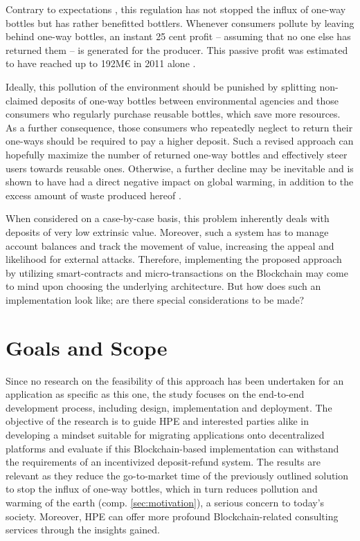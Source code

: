 Contrary to expectations  \cite[p.~10]{Hartlep2011Recycling}, this regulation has not stopped the influx of one-way bottles but has rather benefitted bottlers. Whenever consumers pollute by leaving behind one-way bottles, an instant 25 cent profit -- assuming that no one else has returned them -- is generated for the producer. This passive profit was estimated to have reached up to 192M\euro{} in 2011 alone \cite[p.~245]{PWC2011Mehrweg}. 


Ideally, this pollution of the environment should be punished by splitting non-claimed deposits of one-way bottles between environmental agencies and those consumers who regularly purchase reusable bottles, which save more resources. As a further consequence, those consumers who repeatedly neglect to return their one-ways should be required to pay a higher deposit. Such a revised approach can hopefully maximize the number of returned one-way bottles and effectively steer users towards reusable ones. Otherwise, a further decline may be inevitable and is shown to have had a direct negative impact on global warming, in addition to the excess amount of waste produced hereof \cite{DUHEinweg}.

When considered on a case-by-case basis, this problem inherently deals with deposits of very low extrinsic value. Moreover, such a system has to manage account balances and track the movement of value, increasing the appeal and likelihood for external attacks. Therefore, implementing the proposed approach by utilizing smart-contracts and micro-transactions on the Blockchain may come to mind upon choosing the underlying architecture. But how does such an implementation look like; are there special considerations to be made? 



\section{Goals and Scope}
Since no research on the feasibility of this approach has been undertaken for an application as specific as this one, the study focuses on the end-to-end development process, including design, implementation and deployment. The objective of the research is to guide \ac{HPE} and interested parties alike in developing a mindset suitable for migrating applications onto decentralized platforms and evaluate if this Blockchain-based implementation can withstand the requirements of an incentivized deposit-refund system. The results are relevant as they reduce the go-to-market time of the previously outlined solution to stop the influx of one-way bottles, which in turn reduces pollution and warming of the earth (comp. \ref{sec:motivation}), a serious concern to today's society. Moreover, \ac{HPE} can offer more profound Blockchain-related consulting services through the insights gained.

